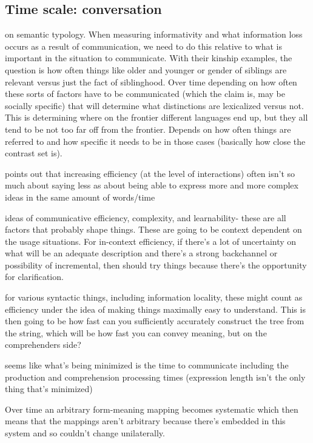 \documentclass[]{article}
\begin{document}
\subsection{Time scale: conversation} 

\cite{kemp2018} on semantic typology. When measuring informativity and what information loss occurs as a result of communication, we need to do this relative to what is important in the situation to communicate. With their kinship examples, the question is how often things like older and younger or gender of siblings are relevant versus just the fact of siblinghood. Over time depending on how often these sorts of factors have to be communicated (which the claim is, may be socially specific) that will determine what distinctions are lexicalized versus not. This is determining where on the frontier different languages end up, but they all tend to be not too far off from the frontier. Depends on how often things are referred to and how specific it needs to be in those cases (basically how close the contrast set is). 

\cite{hawkins2021} points out that increasing efficiency (at the level of interactions) often isn't so much about saying less as about being able to express more and more complex ideas in the same amount of words/time 

\cite{gibson2019} ideas of communicative efficiency, complexity, and learnability- these are all factors that probably shape things. These are going to be context dependent on the usage situations. For in-context efficiency, if there's a lot of uncertainty on what will be an adequate description and there's a strong backchannel or possibility of incremental, then should try things because there's the opportunity for clarification. 

\cite{gibson2019} for various syntactic things, including information locality, these might count as efficiency under the idea of making things maximally easy to understand. This is then going to be how fast can you sufficiently accurately construct the tree from the string, which will be how fast you can convey meaning, but on the comprehenders side? 

seems like what's being minimized is the time to communicate including the production and comprehension processing times (expression length isn't the only thing that's minimized)

Over time an arbitrary form-meaning mapping becomes systematic which then means that the mappings aren't arbitrary because there's embedded in this system and so couldn't change unilaterally. 
\end{document}
